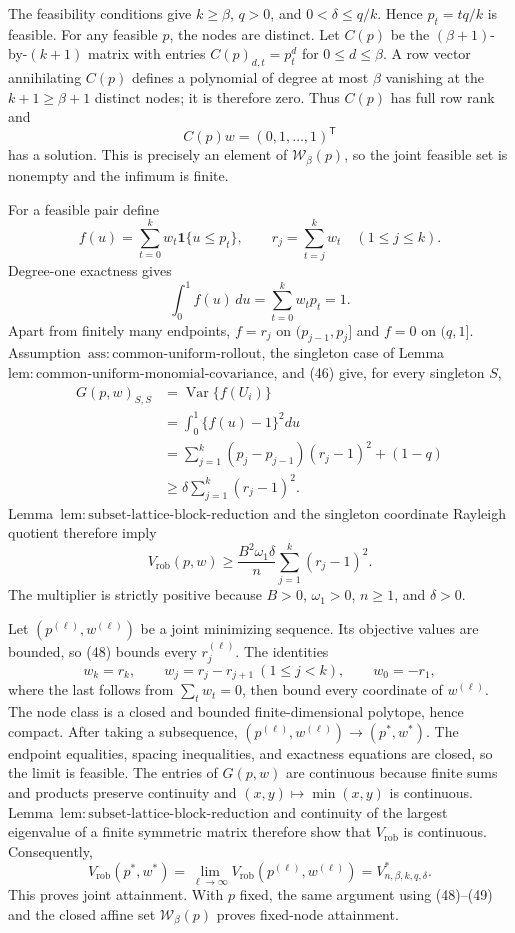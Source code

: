 The feasibility conditions give \(k\ge\beta\), \(q>0\), and \(0<\delta\le q/k\).  Hence \(p_t=tq/k\) is feasible.  For any feasible \(p\), the nodes are distinct.  Let \(C(p)\) be the \((\beta+1)\)-by-\((k+1)\) matrix with entries \(C(p)_{d,t}=p_t^d\) for \(0\le d\le\beta\).  A row vector annihilating \(C(p)\) defines a polynomial of degree at most \(\beta\) vanishing at the \(k+1\ge\beta+1\) distinct nodes; it is therefore zero.  Thus \(C(p)\) has full row rank and
\[
C(p)w=(0,1,\ldots,1)^{\mathsf T}
\]
has a solution.  This is precisely an element of \(\mathcal W_\beta(p)\), so the joint feasible set is nonempty and the infimum is finite.

For a feasible pair define
\[
f(u)=\sum_{t=0}^kw_t\mathbf 1\{u\le p_t\},
\qquad
r_j=\sum_{t=j}^kw_t\quad(1\le j\le k).
\]
Degree-one exactness gives
\[
\int_0^1f(u)\,du=\sum_{t=0}^kw_tp_t=1.
\tag{46}
\]
Apart from finitely many endpoints, \(f=r_j\) on \((p_{j-1},p_j]\) and \(f=0\) on \((q,1]\).  Assumption~\(\mathrm{ass{:}common\text{-}uniform\text{-}rollout}\), the singleton case of Lemma~\(\mathrm{lem{:}common\text{-}uniform\text{-}monomial\text{-}covariance}\), and (46) give, for every singleton \(S\),
\[
\begin{aligned}
G(p,w)_{S,S}
&=\operatorname{Var}\{f(U_i)\}\\
&=\int_0^1\{f(u)-1\}^2du\\
&=\sum_{j=1}^k(p_j-p_{j-1})(r_j-1)^2+(1-q)\\
&\ge\delta\sum_{j=1}^k(r_j-1)^2.
\end{aligned}
\tag{47}
\]
Lemma~\(\mathrm{lem{:}subset\text{-}lattice\text{-}block\text{-}reduction}\) and the singleton coordinate Rayleigh quotient therefore imply
\[
V_{\mathrm{rob}}(p,w)
\ge\frac{B^2\omega_1\delta}{n}
\sum_{j=1}^k(r_j-1)^2.
\tag{48}
\]
The multiplier is strictly positive because \(B>0\), \(\omega_1>0\), \(n\ge1\), and \(\delta>0\).

Let \((p^{(\ell)},w^{(\ell)})\) be a joint minimizing sequence.  Its objective values are bounded, so (48) bounds every \(r_j^{(\ell)}\).  The identities
\[
w_k=r_k,
\qquad
w_j=r_j-r_{j+1}\ (1\le j<k),
\qquad
w_0=-r_1,
\tag{49}
\]
where the last follows from \(\sum_tw_t=0\), then bound every coordinate of \(w^{(\ell)}\).  The node class is a closed and bounded finite-dimensional polytope, hence compact.  After taking a subsequence, \((p^{(\ell)},w^{(\ell)})\to(p^*,w^*)\).  The endpoint equalities, spacing inequalities, and exactness equations are closed, so the limit is feasible.  The entries of \(G(p,w)\) are continuous because finite sums and products preserve continuity and \((x,y)\mapsto\min(x,y)\) is continuous.  Lemma~\(\mathrm{lem{:}subset\text{-}lattice\text{-}block\text{-}reduction}\) and continuity of the largest eigenvalue of a finite symmetric matrix therefore show that \(V_{\mathrm{rob}}\) is continuous.  Consequently,
\[
V_{\mathrm{rob}}(p^*,w^*)
=\lim_{\ell\to\infty}V_{\mathrm{rob}}(p^{(\ell)},w^{(\ell)})
=V^*_{n,\beta,k,q,\delta}.
\]
This proves joint attainment.  With \(p\) fixed, the same argument using (48)--(49) and the closed affine set \(\mathcal W_\beta(p)\) proves fixed-node attainment.